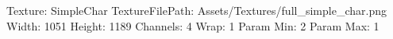 Texture: SimpleChar
TextureFilePath: Assets/Textures/full_simple_char.png
Width: 1051
Height: 1189
Channels: 4
Wrap: 1
Param Min: 2
Param Max: 1